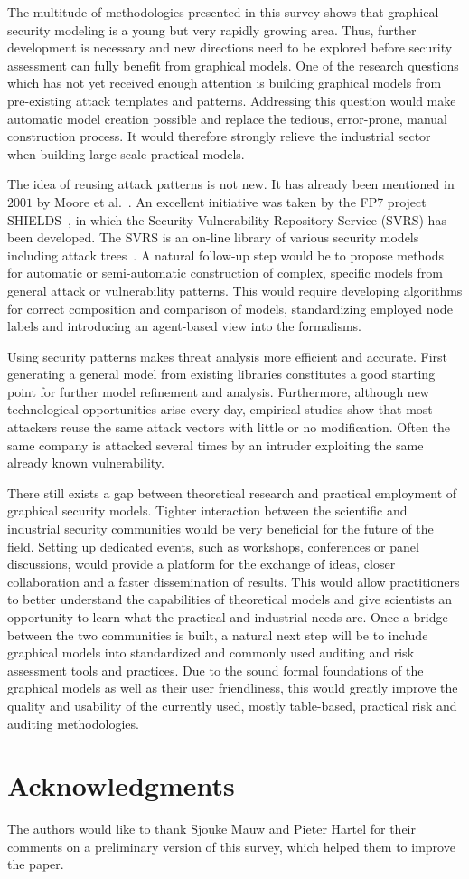 \documentclass[a4paper]{article}
\begin{document}
The multitude of methodologies presented in this survey shows that graphical
security modeling is a young but very rapidly growing area. Thus, further
development is necessary and new directions need to be explored before security
assessment can fully benefit from graphical models. One of the research
questions which has not yet received enough attention is building graphical
models from pre-existing attack templates and patterns. Addressing this question
would make automatic model creation possible and replace the tedious,
error-prone, manual construction process. It would therefore strongly relieve
the industrial sector when building large-scale practical models. 

The idea of reusing attack patterns is not new. It has already been mentioned
in~$2001$ by Moore et al.~\cite{MoElLi}. An excellent initiative was taken by
the FP7 project SHIELDS~\cite{Website_SHIELDS}, in which the Security
Vulnerability Repository Service (SVRS) has been developed. The SVRS is an
on-line library of various security models including attack trees~\cite{SVRS}. 
A natural follow-up step would be to propose methods for automatic or
semi-automatic construction of complex, specific models from general attack or
vulnerability patterns. This would require developing algorithms for correct
composition and comparison of models, standardizing employed node labels and
introducing an agent-based view into the formalisms. 

Using security patterns makes threat analysis more efficient and accurate. First
generating a general model from existing libraries constitutes a good starting
point for further model refinement and analysis. Furthermore, although new
technological opportunities arise every day, empirical studies show that most
attackers reuse the same attack vectors with little or no modification. Often
the same company is attacked several times by an intruder exploiting the same
already known vulnerability.

There still exists a gap between theoretical research and practical employment
of graphical security models. Tighter interaction between the scientific and
industrial security communities would be very beneficial for the future of the
field. Setting up dedicated events, such as workshops, conferences or panel
discussions, would provide a platform for the exchange of ideas, closer
collaboration and a faster dissemination of results. This would allow
practitioners to better understand the capabilities of theoretical models and
give scientists an opportunity to learn what the practical and industrial needs
are. Once a bridge between the two communities is built, a natural next step
will be to include graphical models into standardized and commonly used auditing
and risk assessment tools and practices. Due to the sound formal foundations of 
the graphical models as well as their user friendliness, this would greatly
improve the quality and usability of the currently used, mostly table-based,
practical risk and auditing methodologies.

\section*{Acknowledgments}

The authors would like to thank Sjouke Mauw and Pieter Hartel for their 
comments on a preliminary version of this survey, which helped them to improve 
the paper.

 

\end{document}
